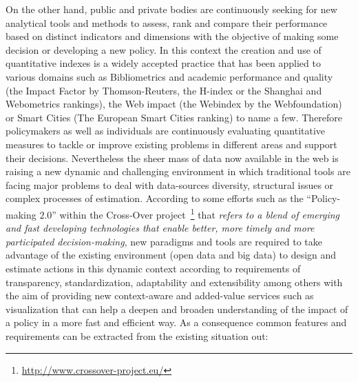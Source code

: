 On the other hand, public and private bodies are continuously seeking for new analytical tools 
and methods to assess, rank and compare their performance based on distinct indicators and dimensions 
with the objective of making some decision or developing a new policy. 
In this context the creation and use of quantitative indexes is a widely accepted practice that has been applied to various 
domains such as Bibliometrics and academic performance and quality (the Impact Factor by Thomson-Reuters, the H-index or the Shanghai and Webometrics rankings), 
the Web impact (the Webindex by the Webfoundation) or Smart Cities (The European Smart Cities ranking) to name a few. 
Therefore policymakers as well as individuals are continuously evaluating quantitative measures to tackle or improve 
existing problems in different areas and support their decisions. Nevertheless the sheer mass of data now available in the web is 
raising a new dynamic and challenging environment in which traditional tools are facing major problems to deal with data-sources diversity, structural issues or complex processes of estimation. According to some efforts 
such as the ``Policy-making $2.0$'' within the Cross-Over project~\footnote{\url{http://www.crossover-project.eu/}} that \textit{refers to a blend of emerging and fast developing technologies 
that enable better, more timely and more participated decision-making}, new paradigms and tools are required to take advantage of 
the existing environment (open data and big data) to design and estimate actions in this dynamic context according to requirements of 
transparency, standardization, adaptability and extensibility among others with the aim of providing new context-aware 
and added-value services such as visualization that can help a deepen and broaden understanding of the impact of a 
policy in a more fast and efficient way. As a consequence common features and requirements can be extracted from the existing situation out:
